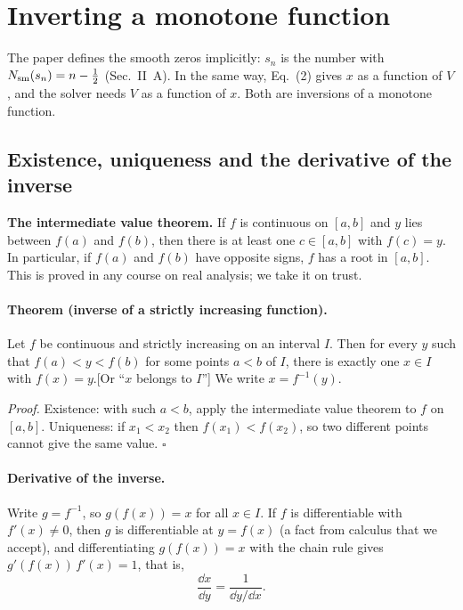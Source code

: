 \section{Inverting a monotone function}\label{sec:asymptotics-inverse}

The paper defines the smooth zeros implicitly: $s_n$ is the number with $N_{\mathrm{sm}}(s_n)=n-\tfrac12$ (Sec.~II~A). In the same way, Eq.~(2) gives $x$ as a function of $V$, and the solver needs $V$ as a function of $x$. Both are inversions of a monotone function.

\subsection{Existence, uniqueness and the derivative of the inverse}

\begin{beyond}
\textbf{The intermediate value theorem.} If $f$ is continuous on $[a,b]$ and $y$ lies between $f(a)$ and $f(b)$, then there is at least one $c\in[a,b]$ with $f(c)=y$. In particular, if $f(a)$ and $f(b)$ have opposite signs, $f$ has a root in $[a,b]$. This is proved in any course on real analysis; we take it on trust.
\end{beyond}

\paragraph{Theorem (inverse of a strictly increasing function).} Let $f$ be continuous and strictly increasing on an interval $I$. Then for every $y$ such that $f(a)<y<f(b)$ for some points $a<b$ of $I$, there is exactly one $x\in I$ with $f(x)=y$.[Or ``$x$ belongs to $I$''] We write $x=f^{-1}(y)$.

\emph{Proof.} Existence: with such $a<b$, apply the intermediate value theorem to $f$ on $[a,b]$. Uniqueness: if $x_1<x_2$ then $f(x_1)<f(x_2)$, so two different points cannot give the same value. \hfill$\square$

\paragraph{Derivative of the inverse.} Write $g=f^{-1}$, so $g(f(x))=x$ for all $x\in I$. If $f$ is differentiable with $f'(x)\neq0$, then $g$ is differentiable at $y=f(x)$ (a fact from calculus that we accept), and differentiating $g(f(x))=x$ with the chain rule gives $g'(f(x))\,f'(x)=1$, that is,
\begin{equation}
\frac{\dd x}{\dd y}=\frac{1}{\dd y/\dd x}.
\label{eq:asymptotics-inverse-derivative}
\end{equation}

